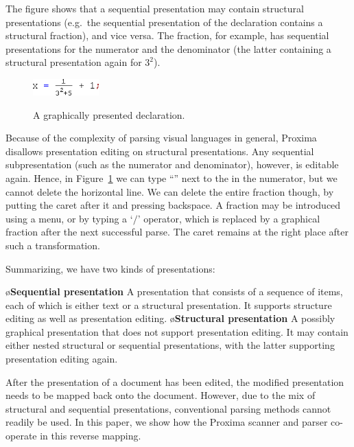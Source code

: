 \documentclass[12pt]{article}
\begin{document}
The figure shows that a sequential presentation may contain structural presentations (e.g.\ the sequential presentation of the declaration contains a structural fraction), and vice versa. The fraction, for example, has sequential presentations for the numerator and the denominator (the latter containing a structural presentation again for $3^2$).


\begin{figure}
\begin{center}
\includegraphics[width=1in]{images/scanFrac}\
\end{center}
\caption{A graphically presented declaration.} \label{fig:graphicalDecl} 
\end{figure}




Because of the complexity of parsing visual languages in general, Proxima disallows presentation editing on structural presentations. Any sequential subpresentation (such as the numerator and denominator), however, is editable again. Hence, in Figure~\ref{fig:graphicalDecl} we can type ``'' next to the  in the numerator, but we cannot delete the horizontal line. We can delete the entire fraction though, by putting the caret after it and pressing backspace. A fraction may be introduced using a menu, or by typing a `$/$' operator, which is replaced by a graphical fraction after the next successful parse. The caret remains at the right place after such a transformation.

Summarizing, we have two kinds of presentations:

\bl
\o {\bf Sequential presentation} A presentation that consists of a sequence of items, each of which is either text or a structural presentation. It supports structure editing as well as presentation editing.
\o {\bf Structural presentation} A possibly graphical presentation that does not support presentation editing. It may contain either nested structural or sequential presentations, with the latter supporting presentation editing again.
\el


After the presentation of a document has been edited, the modified presentation needs to be mapped back onto the document. However, due to the mix of structural and sequential presentations, conventional parsing methods cannot readily be used. In this paper, we show how the Proxima scanner and parser co-operate in this reverse mapping. 
\end{document}
